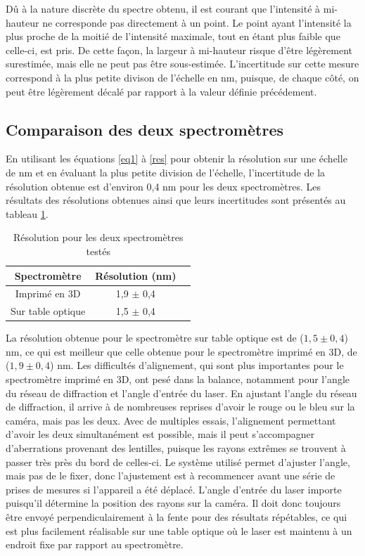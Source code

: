 \documentclass[11pt,letterpaper]{article}
\begin{document}
Dû à la nature discrète du spectre obtenu, il est courant que l'intensité à 
mi-hauteur ne corresponde pas directement à un point. Le point ayant l'intensité la plus proche
de la moitié de l'intensité maximale, tout en étant plus faible que celle-ci, est pris. De
cette façon, la largeur à mi-hauteur risque d'être légèrement surestimée, mais elle ne peut pas
être sous-estimée. L'incertitude sur cette mesure correspond à la plus petite divison de l'échelle en nm,
puisque, de chaque côté, on peut être légèrement décalé par rapport à la valeur définie précédement.

\subsection{Comparaison des deux spectromètres}

En utilisant les équations \ref{eq1} à \ref{res} pour obtenir la résolution sur une échelle de nm et en évaluant la plus petite division de l'échelle,
l'incertitude de la résolution obtenue est d'environ 0,4 nm pour les deux spectromètres. Les résultats 
des résolutions obtenues ainsi que leurs incertitudes sont présentés au tableau \ref{res_tab}.

\begin{table}[H]
  \centering
  \begin{tabular}{|c|c|c|}\hline
    Spectromètre & Résolution (nm) \\
    \hline
    Imprimé en 3D & 1,9 $\pm$ 0,4\\    \hline
    Sur table optique & 1,5 $\pm$ 0,4\\    \hline
  \end{tabular}
  \caption{Résolution pour les deux spectromètres testés}
  \label{res_tab}
\end{table}

La résolution obtenue pour le spectromètre sur table optique est de ($1,5 \pm 0,4$) nm, ce qui
est meilleur que celle obtenue pour le spectromètre imprimé en 3D, de ($1,9 \pm 0,4$) nm. Les difficultés d'alignement, qui sont plus importantes pour le spectromètre imprimé en 3D, ont
pesé dans la balance, notamment pour l'angle du réseau de diffraction et l'angle d'entrée du laser. 
En ajustant l'angle du réseau de diffraction, il arrive à de nombreuses reprises d'avoir 
le rouge ou le bleu sur la caméra, mais pas les deux.
Avec de multiples essais, l'alignement permettant d'avoir les deux simultanément est possible,
mais il peut s'accompagner d'aberrations provenant des lentilles, puisque les rayons extrêmes
se trouvent à passer très près du bord de celles-ci. Le système utilisé permet d'ajuster l'angle,
mais pas de le fixer, donc l'ajustement est à recommencer avant une série de prises de mesures si
l'appareil a été déplacé. 
L'angle d'entrée du laser importe puisqu'il détermine la position des rayons sur la caméra. Il doit
donc toujours être envoyé perpendiculairement à la fente pour des résultats répétables, ce qui est
plus facilement réalisable sur une table optique où le laser est maintenu à un endroit fixe par 
rapport au spectromètre.  
\end{document}
